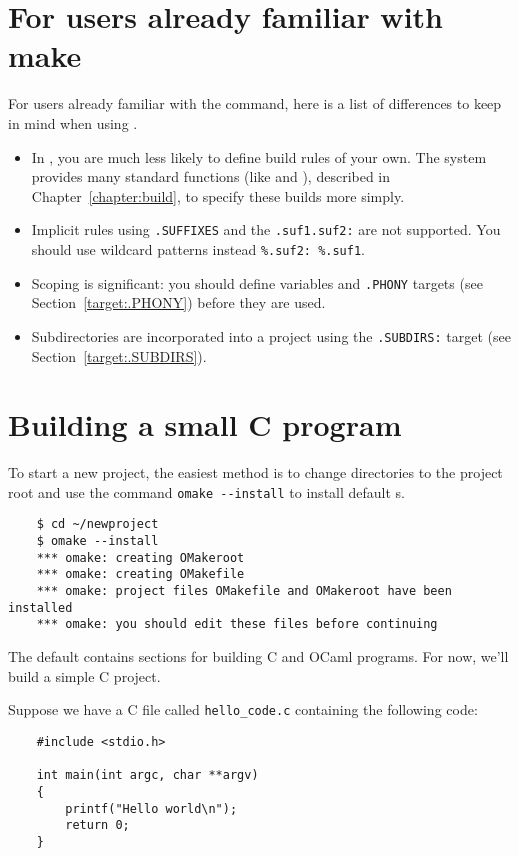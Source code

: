 \section{For users already familiar with make}

For users already familiar with the  command, here is a list of
differences to keep in mind when using .

\begin{itemize}
\item In , you are much less likely to define build rules of your own.
  The system provides many standard functions (like  and ),
  described in Chapter~\ref{chapter:build}, to specify these builds more simply.
\item Implicit rules using \verb+.SUFFIXES+ and the \verb+.suf1.suf2:+ are not supported.
  You should use wildcard patterns instead \verb+%.suf2: %.suf1+.
\item Scoping is significant: you should define variables and \verb+.PHONY+
  targets (see Section~\ref{target:.PHONY}) before they are used.
\item Subdirectories are incorporated into a project using the
  \verb+.SUBDIRS:+ target (see Section~\ref{target:.SUBDIRS}).
\end{itemize}

\section{Building a small C program}

To start a new project, the easiest method is to change directories to the project
root and use the command \verb+omake --install+ to install default s.

\begin{verbatim}
    $ cd ~/newproject
    $ omake --install
    *** omake: creating OMakeroot
    *** omake: creating OMakefile
    *** omake: project files OMakefile and OMakeroot have been installed
    *** omake: you should edit these files before continuing
\end{verbatim}

The default  contains sections for building C and OCaml programs.
For now, we'll build a simple C project.

Suppose we have a C file called \verb+hello_code.c+ containing the following code:

\begin{verbatim}
    #include <stdio.h>

    int main(int argc, char **argv)
    {
        printf("Hello world\n");
        return 0;
    }
\end{verbatim}

